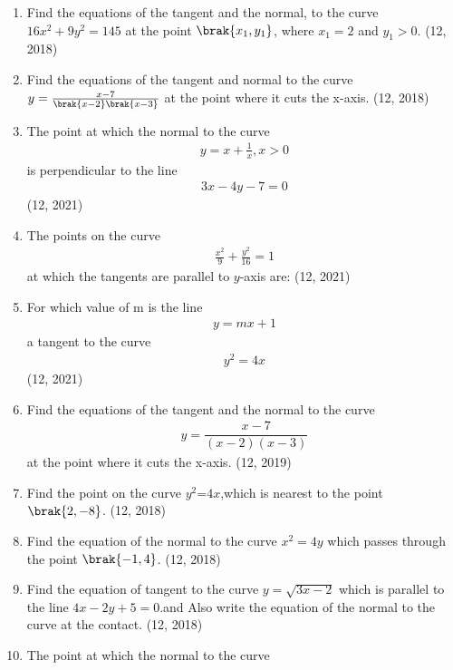 \begin{enumerate}[label=\thesubsection.\arabic*,ref=\thesubsection.\theenumi]
\item Find the equations of the tangent and the normal, to the curve $16x^{2}+9y^{2}=145$ at the point $\brak{x_1,y_1}$, where $x_1=2$ and $y_1>0$. \hfill (12, 2018)
\item Find the equations of the tangent and normal to the curve $y = \frac{x - 7}{\brak{x - 2}\brak{x - 3}}$ at the point where it cuts the x-axis.
\hfill (12, 2018)
\item The point at which the normal to the curve 
\begin{align}
    y = x+\frac{1}{x}, x>0 
\end{align}
 is perpendicular to the line
 \begin{align}
     3x-4y-7 = 0 
 \end{align}
\hfill (12, 2021)
         \item The points on the curve
         \begin{align}
             \frac{x^2}{9} +\frac{y^2}{16} = 1
         \end{align}
         at which the tangents are parallel to $y$-axis are:
\hfill (12, 2021)
         \item For which value of m is the line
         \begin{align}
            y = mx + 1 
         \end{align}a tangent to the curve 
        \begin{align}
            y^2 = 4x 
        \end{align}
\hfill (12, 2021)
\item Find the equations of the tangent and the normal to the curve 
\begin{align*}
y=\dfrac{x-7}{(x-2)(x-3)}    
\end{align*}
at the point where it cuts the x-axis.
\hfill (12, 2019)
\item Find the point on the curve $y^2$=$4x$,which is nearest to the point $\brak{2,-8}$.  
\hfill (12, 2018)
\item Find the equation of the normal to the curve ${x}^2 = 4y$ which passes through the point $\brak{-1, 4}$.
\hfill (12, 2018)
\item Find the equation of tangent to the curve $y=\sqrt{3x-2}$ which is parallel to the line $4x-2y+5=0$.and Also write the equation of the normal to the curve at the contact.
\hfill (12, 2018)
\item The point at which the normal to the curve 

\end{enumerate}
